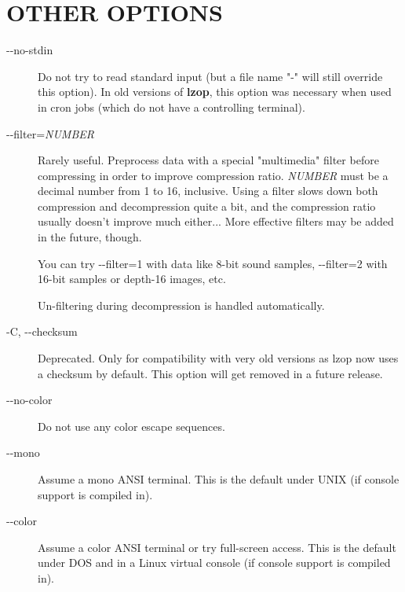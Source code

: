 \section{OTHER OPTIONS\label{OTHER_OPTIONS}}
\begin{description}

\item[{-{}-no-stdin}] \mbox{}

Do not try to read standard input (but a file name "-" will
still override this option).
In old versions of \textbf{lzop}, this option was necessary when
used in cron jobs (which do not have a controlling terminal).


\item[{-{}-filter=\textit{NUMBER}}] \mbox{}

Rarely useful.
Preprocess data with a special "multimedia" filter
before compressing in order to improve compression ratio.
\textit{NUMBER} must be a decimal number from 1 to 16, inclusive.
Using a filter slows down both compression and decompression
quite a bit, and the compression ratio usually doesn't improve
much either...
More effective filters may be added in the future, though.



You can try -{}-filter=1 with data like 8-bit sound samples,
-{}-filter=2 with 16-bit samples or depth-16 images, etc.



Un-filtering during decompression is handled automatically.


\item[{-C, -{}-checksum}] \mbox{}

Deprecated. Only for compatibility with very old versions
as lzop now uses a checksum by default. This option will
get removed in a future release.


\item[{-{}-no-color}] \mbox{}

Do not use any color escape sequences.


\item[{-{}-mono}] \mbox{}

Assume a mono ANSI terminal. This is the default under UNIX
(if console support is compiled in).


\item[{-{}-color}] \mbox{}

Assume a color ANSI terminal or try full-screen access. This
is the default under DOS and in a Linux virtual console
(if console support is compiled in).

\end{description}
